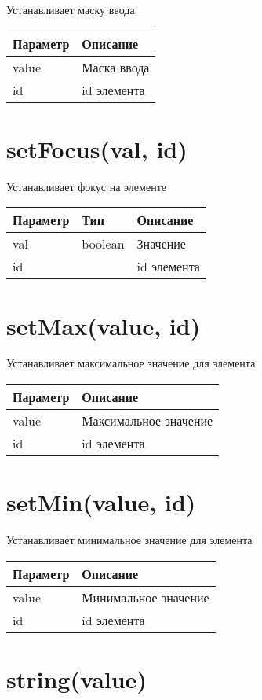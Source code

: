 Устанавливает маску ввода


\begin{longtable}[]{@{}ll@{}}
\toprule
Параметр & Описание\tabularnewline
\midrule
\endhead
value & Маска ввода\tabularnewline
id & id элемента\tabularnewline
\bottomrule
\end{longtable}

\hypertarget{setfocusval-id}{%
\section{setFocus(val, id)}\label{setfocusval-id}}

Устанавливает фокус на элементе


\begin{longtable}[]{@{}lll@{}}
\toprule
Параметр & Тип & Описание\tabularnewline
\midrule
\endhead
val & boolean & Значение\tabularnewline
id & & id элемента\tabularnewline
\bottomrule
\end{longtable}

\hypertarget{setmaxvalue-id}{%
\section{setMax(value, id)}\label{setmaxvalue-id}}

Устанавливает максимальное значение для элемента


\begin{longtable}[]{@{}ll@{}}
\toprule
Параметр & Описание\tabularnewline
\midrule
\endhead
value & Максимальное значение\tabularnewline
id & id элемента\tabularnewline
\bottomrule
\end{longtable}

\hypertarget{setminvalue-id}{%
\section{setMin(value, id)}\label{setminvalue-id}}

Устанавливает минимальное значение для элемента


\begin{longtable}[]{@{}ll@{}}
\toprule
Параметр & Описание\tabularnewline
\midrule
\endhead
value & Минимальное значение\tabularnewline
id & id элемента\tabularnewline
\bottomrule
\end{longtable}

\hypertarget{stringvalue-string}{%
\section{string(value)}\label{stringvalue-string}}

